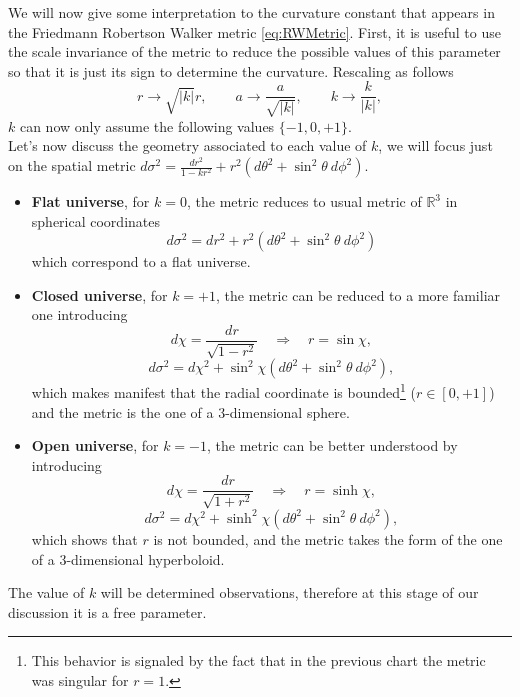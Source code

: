 We will now give some interpretation to the curvature constant that appears in the Friedmann Robertson Walker metric \eqref{eq:RWMetric}. First, it is useful to use the scale invariance of the metric to reduce the possible values of this parameter so that it is just its sign to determine the curvature. Rescaling as follows 
\begin{equation*}
    r\rightarrow\sqrt{|k|}r,\qquad a\rightarrow\frac{a}{\sqrt{|k|}},\qquad k\rightarrow\frac{k}{|k|},
\end{equation*}  
$k$ can now only assume the following values $\{-1,0,+1\}$. \\
Let's now discuss the geometry associated to each value of $k$, we will focus just on the spatial metric $d\sigma^2=\frac{dr^2}{1-kr^2}+r^2(d\theta^2+\sin^2\theta\ d\phi^2)$.
\begin{itemize}
    \item \textbf{Flat universe}, for $k=0$, the metric reduces to usual metric of $\mathbb{R}^3$ in spherical coordinates $$d\sigma^2= dr^2+r^2(d\theta^2+\sin^2\theta\ d\phi^2)$$ which correspond to a flat universe.
    \item \textbf{Closed universe}, for $k=+1$, the metric can be reduced to a more familiar one introducing $$d\chi=\frac{dr}{\sqrt{1-r^2}}\quad\Rightarrow\quad r=\sin\chi,$$$$d\sigma^2=d\chi^2+\sin^2\chi(d\theta^2+\sin^2\theta\ d\phi^2),$$which makes manifest that the radial coordinate is bounded\footnote{This behavior is signaled by the fact that in the previous chart the metric was singular for $r=1$.} ($r\in[0,+1]$) and the metric is the one of a $3$-dimensional sphere.
    \item \textbf{Open universe}, for $k=-1$, the metric can be better understood by introducing$$d\chi=\frac{dr}{\sqrt{1+r^2}}\quad\Rightarrow\quad r=\sinh\chi,$$$$d\sigma^2=d\chi^2+\sinh^2\chi(d\theta^2+\sin^2\theta\ d\phi^2),$$ which shows that $r$ is not bounded, and the metric takes the form of the one of a $3$-dimensional hyperboloid.
\end{itemize}
The value of $k$ will be determined observations, therefore at this stage of our discussion it is a free parameter.

